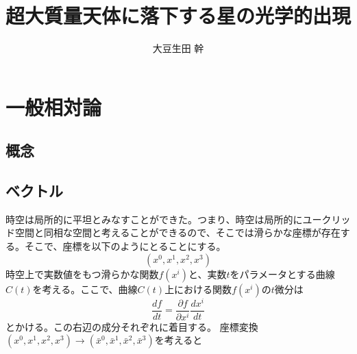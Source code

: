 \documentclass[dvipdfmx]{report} %
\title{超大質量天体に落下する星の光学的出現}
\author{大豆生田 幹}
\date{}
\begin{document}
\maketitle %
\tableofcontents %
\fontsize{11pt}{11pt}\selectfont %

\chapter{一般相対論}

\section{概念}

\section{ベクトル}
時空は局所的に平坦とみなすことができた。つまり、時空は局所的にユークリッド空間と同相な空間と考えることができるので、そこでは滑らかな座標が存在する。そこで、座標を以下のようにとることにする。
\[ (x^0, x^1, x^2, x^3) \]
時空上で実数値をもつ滑らかな関数$f(x^i)$と、実数$t$をパラメータとする曲線$C(t)$を考える。ここで、曲線$C(t)$上における関数$f(x^i)$の$t$微分は
\[ \frac{df}{dt} = \frac{\partial f}{\partial x^i} \frac{dx^i}{dt} \]
とかける。この右辺の成分それぞれに着目する。
座標変換$(x^0, x^1, x^2, x^3) \rightarrow (\bar{x}^0, \bar{x}^1, \bar{x}^2, \bar{x}^3)$を考えると
\end{document}

